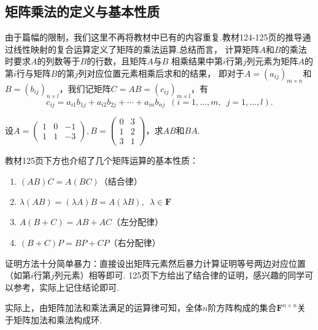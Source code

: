 \subsection{矩阵乘法的定义与基本性质}
由于篇幅的限制，我们这里不再将教材中已有的内容重复.教材124-125页的推导通过线性映射的复合运算定义了矩阵的乘法运算.总结而言，
计算矩阵$A$和$B$的乘法时要求$A$的列数等于$B$的行数，且矩阵$A$与$B$
相乘结果中第$i$行第$j$列元素为矩阵$A$的第$i$行与矩阵$B$的第$j$列对应位置元素相乘后求和的结果，
即对于$A=(a_{ij})_{m \times n}$和$B=(b_{ij})_{n \times l}$，我们记矩阵$C=AB=(c_{ij})_{m \times l}$，有
\[c_{ij}=a_{i1}b_{1j}+a_{i2}b_{2j}+\cdots+a_{in}b_{nj}\enspace(i=1,\ldots,m,\enspace j=1,\ldots,l).\]

\begin{example}
    设$A=\begin{pmatrix}
        1 & 0 & -1 \\ 1 & 1 & -3
    \end{pmatrix}, B=\begin{pmatrix}
        0 & 3 \\ 1 & 2 \\ 3 & 1
    \end{pmatrix}$，求$AB$和$BA$.
\end{example}
\begin{solution}

\end{solution}

教材125页下方也介绍了几个矩阵运算的基本性质：
\begin{enumerate}[label=(\arabic*)]
    \item $(AB)C=A(BC)$（结合律）
    \item $\lambda(AB)=(\lambda A)B=A(\lambda B),\enspace \lambda \in \mathbf{F}$
    \item $A(B+C)=AB+AC$（左分配律）
    \item $(B+C)P=BP+CP$（右分配律）
\end{enumerate}
证明方法十分简单暴力：直接设出矩阵元素然后暴力计算证明等号两边对应位置（如第$i$行第$j$列元素）相等即可.
125页下方给出了结合律的证明，感兴趣的同学可以参考，实际上记住结论即可.

实际上，由矩阵加法和乘法满足的运算律可知，全体$n$阶方阵构成的集合$\mathbf{F}^{n\times n}$关于矩阵加法和乘法构成环.

